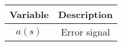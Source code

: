     \begin{tabular}{|c|c|} 
    \hline
\textbf{Variable}& \textbf{Description}\\\hline
    $a(s)$& Error signal\\\hline
    \end{tabular}
